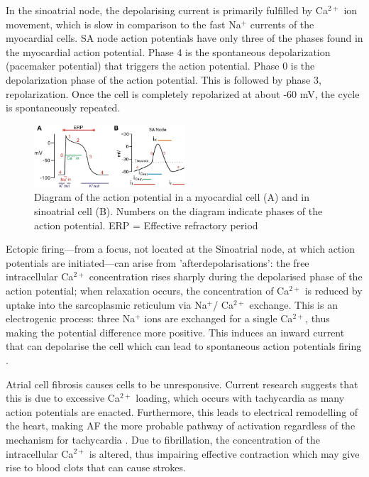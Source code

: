 \documentclass[twocolumn]{article}
\begin{document}
In the sinoatrial node, the depolarising current is primarily fulfilled by Ca$^{2+}$ ion movement, which is slow in comparison to the fast Na$^{+}$ currents of the myocardial cells. SA node action potentials have only three of the phases found in the myocardial action potential. Phase 4 is the spontaneous depolarization (pacemaker potential) that triggers the action potential. Phase 0 is the depolarization phase of the action potential. This is followed by phase 3, repolarization. Once the cell is completely repolarized at about -60 mV, the cycle is spontaneously repeated.


\begin{figure}
\caption[short title]{Diagram of the action potential in a myocardial cell (A) and in sinoatrial cell (B). Numbers on the diagram indicate phases of the action potential.  ERP = Effective refractory period \cite{Mizzi}}
\centering
\includegraphics[width = 0.5\textwidth]{newactionpot}
\end{figure}

Ectopic firing---from a focus, not located at the Sinoatrial node, at which action potentials are initiated---can arise from 'afterdepolarisations': the free intracellular Ca$^{2+}$ concentration rises sharply during the depolarised phase of the action potential; when relaxation occurs, the concentration of Ca$^{2+}$  is reduced by uptake into the sarcoplasmic reticulum via Na$^{+}$/ Ca$^{2+}$  exchange. This is an electrogenic process: three Na$^{+}$ ions are exchanged for a single Ca$^{2+}$, thus making the potential difference more positive. This induces an inward current that can depolarise the cell which can lead to spontaneous action potentials firing \cite{Nattel2}. 



Atrial cell fibrosis causes cells to be unresponsive. Current research suggests that this is due to excessive Ca$^{2+}$ loading, which occurs with tachycardia as many action potentials are enacted. Furthermore, this leads to electrical remodelling of the heart, making AF the more probable pathway of activation regardless of the mechanism for tachycardia \cite{Nattel2}. Due to fibrillation, the concentration of the intracellular Ca$^{2+}$ is altered, thus impairing effective contraction which may give rise to blood clots that can cause strokes. %
\end{document}
